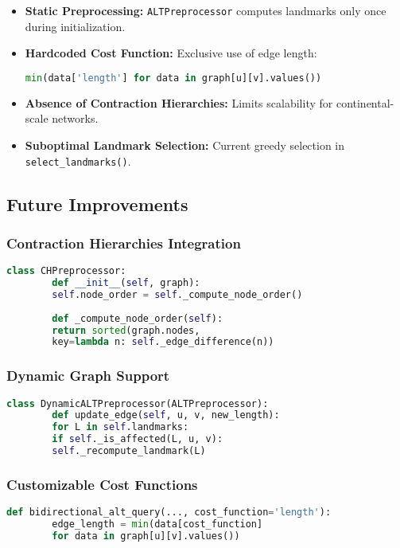 	\begin{itemize}
		\item \textbf{Static Preprocessing:} \texttt{ALTPreprocessor} computes landmarks only once during initialization.
		
		\item \textbf{Hardcoded Cost Function:} Exclusive use of edge length:
		
		\begin{lstlisting}[language=Python]
			min(data['length'] for data in graph[u][v].values())
		\end{lstlisting}
		
		\item \textbf{Absence of Contraction Hierarchies:} Limits scalability for continental-scale networks.
		
		\item \textbf{Suboptimal Landmark Selection:} Current greedy selection in \texttt{select\_landmarks()}.
	\end{itemize}
	
	\subsection*{ Future Improvements}
	
	\subsubsection*{Contraction Hierarchies Integration}
	\begin{lstlisting}[language=Python]
		class CHPreprocessor:
		def __init__(self, graph):
		self.node_order = self._compute_node_order()
		
		def _compute_node_order(self):
		return sorted(graph.nodes,
		key=lambda n: self._edge_difference(n))
	\end{lstlisting}
	
	\subsubsection*{ Dynamic Graph Support}
	\begin{lstlisting}[language=Python]
		class DynamicALTPreprocessor(ALTPreprocessor):
		def update_edge(self, u, v, new_length):
		for L in self.landmarks:
		if self._is_affected(L, u, v):
		self._recompute_landmark(L)
	\end{lstlisting}
	
	\subsubsection*{Customizable Cost Functions}
	\begin{lstlisting}[language=Python]
		def bidirectional_alt_query(..., cost_function='length'):
		edge_length = min(data[cost_function]
		for data in graph[u][v].values())
	\end{lstlisting}
	
